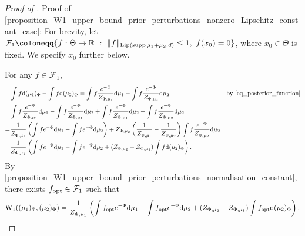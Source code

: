 \documentclass[a4paper]{scrartcl}
\theoremstyle{definition}
\numberwithin{equation}{section}
\newcommand{\R}{\mathbb{R}}
\newcommand{\rd}{\mathrm{d}}
\DeclareMathOperator{\supp}{supp}
\newcommand{\norm}[1]{\Vert #1 \Vert}
\newcommand{\Lip}[0]{\textup{Lip}}
\newcommand{\Was}[0]{\textup{W}}
\newcommand{\opt}[0]{\textup{opt}}
\begin{document}
\begin{proof}[Proof of ]
 Proof of \cref{proposition_W1_upper_bound_prior_perturbations_nonzero_Lipschitz_constant_case}: For brevity, let $\mathcal{F}_1\coloneqq \{f:\Theta\to\R\ :\ \norm{f}_{\Lip(\supp{\mu_1+\mu_2},d)}\leq 1,\ f(x_0)=0\}$, where $x_0\in\Theta$ is fixed.
 We specify $x_0$ further below.
 
 For any $f\in\mathcal{F}_1$,
\begin{align}
&\int f \rd (\mu_1)_\Phi-\int f \rd (\mu_2)_\Phi
=\int f  \frac{e^{-\Phi}}{Z_{\Phi,\mu_1}}\rd\mu_1-\int f\frac{e^{-\Phi}}{Z_{\Phi,\mu_2}}\rd\mu_2
& \text{by \eqref{eq_posterior_function}}
\nonumber
\\
=&\int f  \frac{e^{-\Phi}}{Z_{\Phi,\mu_1}}\rd\mu_1-\int f  \frac{e^{-\Phi}}{Z_{\Phi,\mu_1}}\rd\mu_2+\int f  \frac{e^{-\Phi}}{Z_{\Phi,\mu_1}}\rd\mu_2-\int f\frac{e^{-\Phi}}{Z_{\Phi,\mu_2}}\rd\mu_2
\nonumber
\\
=&\frac{1}{Z_{\Phi,\mu_1}}\left(\int f e^{-\Phi}\rd\mu_1-\int f  e^{-\Phi}\rd\mu_2\right)+Z_{\Phi,\mu_2}\left(\frac{1}{Z_{\Phi,\mu_1}}-\frac{1}{Z_{\Phi,\mu_2}}\right)\int f  \frac{e^{-\Phi}}{Z_{\Phi,\mu_2}}\rd\mu_2
\nonumber
\\
 =&\frac{1}{Z_{\Phi,\mu_1}} \left(\int f e^{-\Phi}\rd \mu_1-\int f e^{-\Phi}\rd \mu_2+(Z_{\Phi,\mu_2}-Z_{\Phi,\mu_1})\int f \rd(\mu_2)_\Phi\right).
 \label{eq_W1_equation00_prior_perturbations}
\end{align}
By \ref{proposition_W1_upper_bound_prior_perturbations_normalisation_constant}, there exists $f_\opt \in\mathcal{F}_1$ such that
\begin{equation*}
\Was_1((\mu_1)_\Phi,(\mu_2)_\Phi)= \frac{1}{Z_{\Phi,\mu_1}} \left(\int f_\opt e^{-\Phi}\rd \mu_1-\int f_\opt e^{-\Phi}\rd \mu_2+(Z_{\Phi,\mu_2}-Z_{\Phi,\mu_1})\int f_\opt \rd(\mu_2)_\Phi\right).
\end{equation*}


\end{proof}
\end{document}
